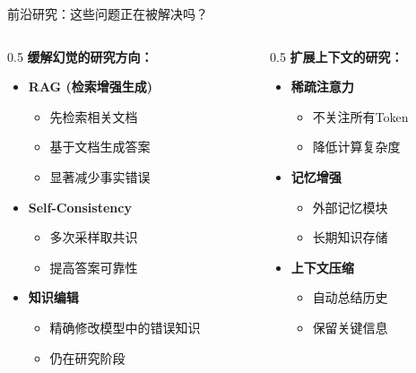 \documentclass[aspectratio=169,11pt]{beamer}
\begin{document}
\begin{frame}{前沿研究：这些问题正在被解决吗？}
    \begin{columns}
        \begin{column}{0.5\textwidth}
            \textbf{缓解幻觉的研究方向：}
            \begin{itemize}
                \item \textbf{RAG (检索增强生成)}
                    \begin{itemize}
                        \item 先检索相关文档
                        \item 基于文档生成答案
                        \item 显著减少事实错误
                    \end{itemize}
                \item \textbf{Self-Consistency}
                    \begin{itemize}
                        \item 多次采样取共识
                        \item 提高答案可靠性
                    \end{itemize}
                \item \textbf{知识编辑}
                    \begin{itemize}
                        \item 精确修改模型中的错误知识
                        \item 仍在研究阶段
                    \end{itemize}
            \end{itemize}
        \end{column}
        \begin{column}{0.5\textwidth}
            \textbf{扩展上下文的研究：}
            \begin{itemize}
                \item \textbf{稀疏注意力}
                    \begin{itemize}
                        \item 不关注所有Token
                        \item 降低计算复杂度
                    \end{itemize}
                \item \textbf{记忆增强}
                    \begin{itemize}
                        \item 外部记忆模块
                        \item 长期知识存储
                    \end{itemize}
                \item \textbf{上下文压缩}
                    \begin{itemize}
                        \item 自动总结历史
                        \item 保留关键信息
                    \end{itemize}
            \end{itemize}
            

\end{column}
\end{columns}
\end{frame}
\end{document}
